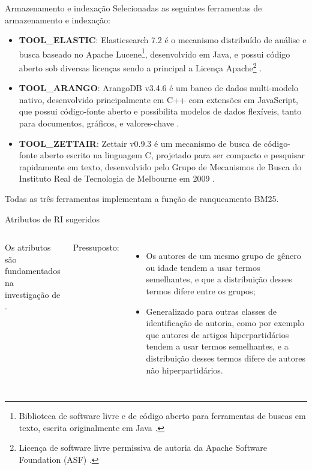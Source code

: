 \documentclass[%
  10pt,%
  aspectratio = 169,%
  compress,%
  t,%
]{beamer}%
\begin{document}
    \begin{frame}{}{Armazenamento e indexação}
        Selecionadas as seguintes ferramentas de armazenamento e indexação:
        \begin{itemize}
            \item \textbf{TOOL\_ELASTIC}: Elasticsearch 7.2 é o mecanismo distribuído de análise e busca baseado no Apache Lucene\footnote{Biblioteca de software livre e de código aberto para ferramentas de buscas em texto, escrita originalmente em Java \cite{LUCENE_DOCUMENTATION_2019}.}, desenvolvido em Java, e possui código aberto sob diversas licenças sendo a principal a Licença Apache\footnote{Licença de software livre permissiva de autoria da Apache Software Foundation (ASF) \cite{NEWMEDIA_OPENGUIDE_2015}.} \cite{ELASTIC_GitHub_2019, ELASTIC_REFERENCE_INTRO_2019}.

            \item \textbf{TOOL\_ARANGO}: ArangoDB v3.4.6 é um banco de dados multi-modelo nativo, desenvolvido principalmente em C++ com extensões em JavaScript, que possui código-fonte aberto e possibilita modelos de dados flexíveis, tanto para documentos, gráficos, e valores-chave \cite{ARANGODB_DOC_2019, ARANGODB_GitHub_2019}.

            \item \textbf{TOOL\_ZETTAIR}: Zettair v0.9.3 é um mecanismo de busca de código-fonte aberto escrito na linguagem C, projetado para ser compacto e pesquisar rapidamente em texto, desenvolvido pelo Grupo de Mecanismos de Busca do Instituto Real de Tecnologia de Melbourne em 2009 \cite{ZETTAIR_HOME_2009}.
        \end{itemize}

        Todas as três ferramentas implementam a função de ranqueamento BM25.
    \end{frame}

    \begin{frame}{}{Atributos de RI sugeridos}
        \begin{columns}[t]
            Os atributos são fundamentados na investigação de \cite{WEREN_MESTRADO_2014}.

            Pressuposto:
            \begin{itemize}
                \item Os autores de um mesmo grupo de gênero ou idade tendem a usar termos semelhantes, e que a distribuição desses termos difere entre os grupos;
                \item Generalizado para outras classes de identificação de autoria, como por exemplo que autores de artigos hiperpartidários tendem a usar termos semelhantes, e a distribuição desses termos difere de autores não hiperpartidários.
            \end{itemize}

            
        \end{columns}
    \end{frame}
\end{document}
